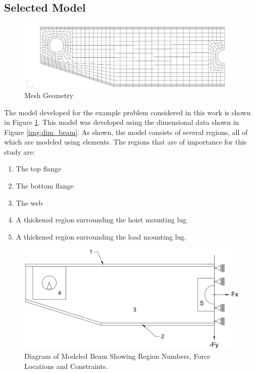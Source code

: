 \subsection{Selected Model}
\label{sec:model}

\begin{figure}
\includegraphics[width=\textwidth]{img/mesh_geom.png}
\caption{Mesh Geometry}
\label{img:mesh_geom}
\end{figure}

The model developed for the example problem considered in this work is shown in Figure \ref{img:mesh_geom}. This model was developed using the dimensional data shown in Figure \ref{img:dim_beam}. As shown, the model consists of several regions, all of which are modeled using  elements. The regions that are of importance for this study are: 

\begin{enumerate}
  \item The top flange
  \item The bottom flange
  \item The web
  \item A thickened region surrounding the hoist mounting lug
  \item A thickened region surrounding the load mounting lug. 
\end{enumerate}

\begin{figure}
\includegraphics[width=\textwidth]{img/numbered_geom.png}
\caption[Diagram of Modeled Beam]{Diagram of Modeled Beam Showing Region Numbers, Force Locations and Constraints.}
\label{img:num_geom}
\end{figure}

